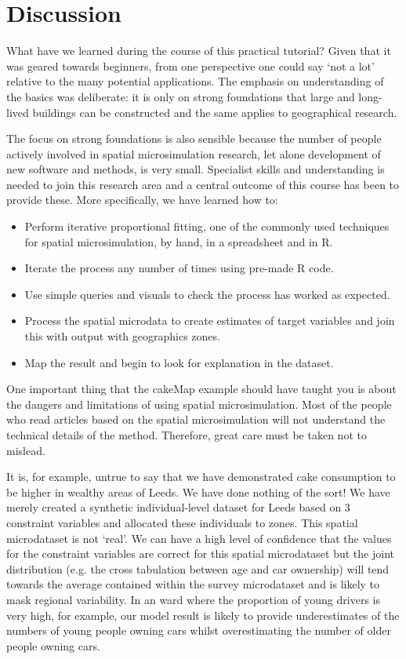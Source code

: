 \documentclass[a4paper, 11pt, twoside]{article}
\begin{document}
\section{Discussion}

What have we learned during the course of this practical tutorial?
Given that it was geared towards beginners, from one perspective
one could say `not a lot' relative to the many potential applications.
The emphasis on understanding of the basics was deliberate: it is only
on strong foundations that large and long-lived buildings can be 
constructed and the same applies to geographical research.

The focus on strong foundations is also sensible because the
number of people actively involved in spatial microsimulation research,
let alone development of new software and methods, is very small.
Specialist skills and understanding is needed to join this research area
and a central outcome of this course has been to provide these.
More specifically, we have learned how to:
\begin{itemize}
 \item Perform iterative proportional fitting, one of the commonly used
techniques for spatial microsimulation, by hand, in a spreadsheet and in R.
 \item Iterate the process any number of times using pre-made R code.
 \item Use simple queries and visuals to check the process has worked as expected.
 \item Process the spatial microdata to create estimates of target variables and
join this with output with geographics zones.
 \item Map the result and begin to look for explanation in the dataset.
\end{itemize}

One important thing that the cakeMap example should have taught you is
about the dangers and limitations of using spatial microsimulation.
Most of the people who read articles based on the spatial microsimulation
will not understand the technical details of the method. Therefore, great
care must be taken not to mislead.

It is, for example, untrue to say
that we have demonstrated cake consumption to be higher in wealthy areas of Leeds.
We have done nothing of the sort! We have merely created a synthetic individual-level
dataset for Leeds based on 3 constraint variables and allocated these individuals to zones.
This spatial microdataset is not `real'. We can have a high level of confidence that the
values for the constraint variables are correct for this spatial microdataset but the joint distribution
(e.g. the cross tabulation between age and car ownership) will tend towards the average
contained within the survey microdataset and is likely to mask regional variability. In an ward
where the proportion of young drivers is very high, for example, our model result is likely
to provide underestimates of the numbers of young people owning cars whilst overestimating
the number of older people owning cars.
\end{document}

